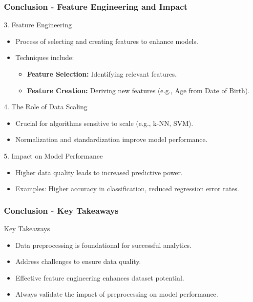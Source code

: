\documentclass[aspectratio=169]{beamer}
\begin{document}
\begin{frame}[fragile]
    \frametitle{Conclusion - Feature Engineering and Impact}
    \begin{block}{3. Feature Engineering}
        \begin{itemize}
            \item Process of selecting and creating features to enhance models.
            \item Techniques include:
            \begin{itemize}
                \item \textbf{Feature Selection:} Identifying relevant features.
                \item \textbf{Feature Creation:} Deriving new features (e.g., Age from Date of Birth).
            \end{itemize}
        \end{itemize}
    \end{block}

    \begin{block}{4. The Role of Data Scaling}
        \begin{itemize}
            \item Crucial for algorithms sensitive to scale (e.g., k-NN, SVM).
            \item Normalization and standardization improve model performance.
        \end{itemize}
    \end{block}
    
    \begin{block}{5. Impact on Model Performance}
        \begin{itemize}
            \item Higher data quality leads to increased predictive power.
            \item Examples: Higher accuracy in classification, reduced regression error rates.
        \end{itemize}
    \end{block}
\end{frame}

\begin{frame}[fragile]
    \frametitle{Conclusion - Key Takeaways}
    \begin{block}{Key Takeaways}
        \begin{itemize}
            \item Data preprocessing is foundational for successful analytics.
            \item Address challenges to ensure data quality.
            \item Effective feature engineering enhances dataset potential.
            \item Always validate the impact of preprocessing on model performance.
        \end{itemize}
    \end{block}
\end{frame}
\end{document}
